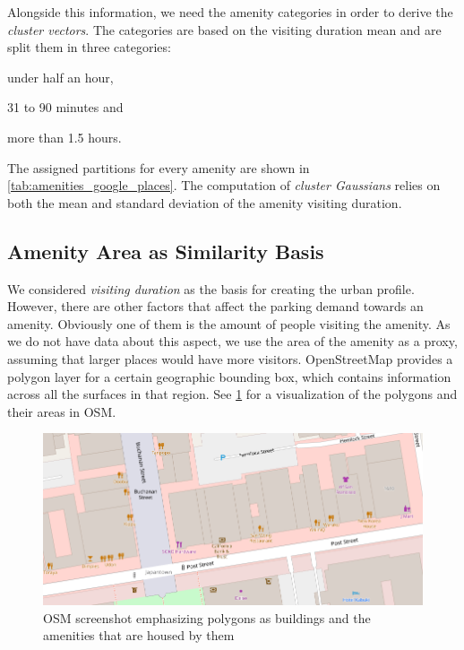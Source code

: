 \documentclass{ws-ijait}
\begin{document}
	Alongside this information, we need the amenity categories in order to derive the \textit{cluster vectors}.
	The categories are based on the visiting duration mean and are split them in three categories: 
	\begin{romanlist}
		\item under half an hour,
		\item 31 to 90 minutes and
		\item more than 1.5 hours. 
	\end{romanlist}
	The assigned partitions for every amenity are shown in \cref{tab:amenities_google_places}. 
	The computation of \textit{cluster Gaussians} relies on both the mean and standard deviation of the amenity visiting duration.

	\subsection{Amenity Area as Similarity Basis}
	\label{experimental_setup:amenity_area}
	We considered \textit{visiting duration} as the basis for creating the urban profile. However, there are other factors that affect the parking demand towards an amenity.
	Obviously one of them is the amount of people visiting the amenity.
	As we do not have data about this aspect, we use the area of the amenity as a proxy, assuming that larger places would have more visitors.
	OpenStreetMap provides a polygon layer for a certain geographic bounding box, which contains information across all the surfaces in that region. See \cref{fig:amenity_polygons} for a visualization of the polygons and their areas in OSM. 
	
	\begin{figure}[!ht]
		\centering
		\includegraphics[width=\textwidth]{../graphics/amenity_polygons4.png}
		\caption{OSM screenshot emphasizing polygons as buildings and the amenities that are housed by them}
		\label{fig:amenity_polygons}
	\end{figure}
	
\end{document}
